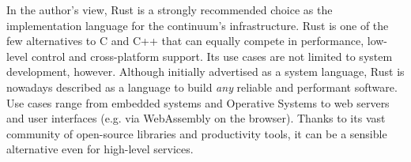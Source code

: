 

In the author's view, Rust is a strongly recommended choice as the implementation language for the continuum's infrastructure. Rust is one of the few alternatives to C and C++ that can equally compete in performance, low-level control and cross-platform support. Its use cases are not limited to system development, however. Although initially advertised as a system language, Rust is nowadays described as a language to build \emph{any} reliable and performant software. Use cases range from embedded systems and Operative Systems to web servers and user interfaces (e.g. via WebAssembly on the browser). Thanks to its vast community of open-source libraries and productivity tools, it can be a sensible alternative even for high-level services.

